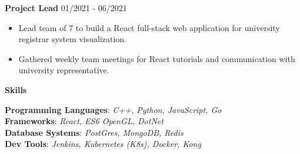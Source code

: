 \documentclass[11pt]{article}
\begin{document}
\textbf{Project Lead} \hfill 01/2021 - 06/2021
\begin{itemize}[noitemsep, topsep=0pt, partopsep=0pt, parsep=0pt]
    \item Lead team of 7 to build a React full-stack web application for university registrar system visualization.
    \item Gathered weekly team meetings for React tutorials and communication with university representative.
\end{itemize}

\begin{center}
    \textbf{Skills}
\end{center}

\textbf{Programming Languages}: \textit{C++, Python, JavaScript, Go}\\
\textbf{Frameworks}: \textit{React, ES6 OpenGL, DotNet}\\
\textbf{Database Systems}: \textit{PostGres, MongoDB, Redis}\\
\textbf{Dev Tools}: \textit{Jenkins, Kubernetes (K8s), Docker, Kong}\\
\end{document}
